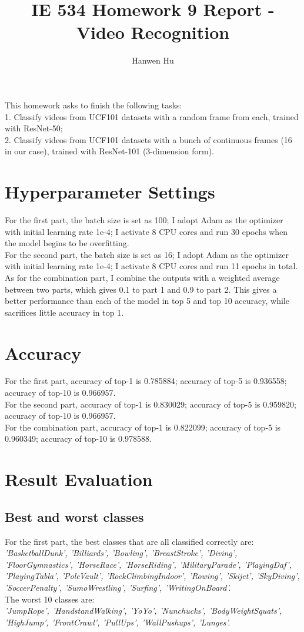\documentclass[15pt]{article}
\title{IE 534 Homework 9 Report - Video Recognition}
\author{Hanwen Hu}
\begin{document}
\maketitle

This homework asks to finish the following tasks:\\
1. Classify videos from UCF101 datasets with a random frame from each, trained with ResNet-50;\\
2. Classify videos from UCF101 datasets with a bunch of continuous frames (16 in our case), trained with ResNet-101 (3-dimension form).\\

\section{Hyperparameter Settings}
For the first part, the batch size is set as 100; I adopt Adam as the optimizer with initial learning rate 1e-4; I activate 8 CPU cores and run 30 epochs when the model begins to be overfitting.\\
For the second part, the batch size is set as 16; I adopt Adam as the optimizer with initial learning rate 1e-4; I activate 8 CPU cores and run 11 epochs in total.\\
As for the combination part, I combine the outputs with a weighted average between two parts, which gives 0.1 to part 1 and 0.9 to part 2. This gives a better performance than each of the model in top 5 and top 10 accuracy, while sacrifices little accuracy in top 1.

\section{Accuracy}
For the first part, accuracy of top-1 is 0.785884; accuracy of top-5 is 0.936558; accuracy of top-10 is 0.966957.\\
For the second part, accuracy of top-1 is 0.830029; accuracy of top-5 is 0.959820; accuracy of top-10 is 0.966957.\\
For the combination part, accuracy of top-1 is 0.822099; accuracy of top-5 is 0.960349; accuracy of top-10 is 0.978588.

\section{Result Evaluation}
\subsection{Best and worst classes}
For the first part, the best classes that are all classified correctly are:\\
\emph{'BasketballDunk', 'Billiards', 'Bowling', 'BreastStroke', 'Diving', 'FloorGymnastics', 'HorseRace', 'HorseRiding', 'MilitaryParade', 'PlayingDaf', 'PlayingTabla', 'PoleVault', 'RockClimbingIndoor', 'Rowing', 'Skijet', 'SkyDiving', 'SoccerPenalty', 'SumoWrestling', 'Surfing', 'WritingOnBoard'.}\\
The worst 10 classes are:\\
\emph{'JumpRope', 'HandstandWalking', 'YoYo', 'Nunchucks', 'BodyWeightSquats', 'HighJump', 'FrontCrawl', 'PullUps', 'WallPushups', 'Lunges'.}\\
\end{document}
